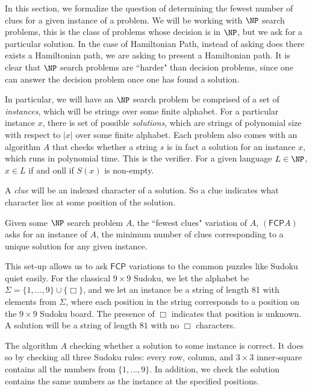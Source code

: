 \documentclass[runningheads,a4paper]{llncs}
\begin{document}
In this section, we formalize the question of determining the fewest number of clues for a given instance of a problem. We will be working with $\NP$ search problems, this is the class of problems whose decision is in $\NP$, but we ask for a particular solution. In the case of Hamiltonian Path, instead of asking does there exists a Hamiltonian path, we are asking to present a Hamiltonian path. It is clear that $\NP$ search problems are ``harder" than decision problems, since one can answer the decision problem once one has found a solution.

In particular, we will have an $\NP$ search problem be comprised of a set of \emph{instances}, which will be strings over some finite alphabet. For a particular instance $x$, there is set of possible \emph{solutions}, which are strings of polynomial size with respect to $|x|$ over some finite alphabet. Each problem also comes with an algorithm $A$ that checks whether a string $s$ is in fact a solution for an instance $x$, which runs in polynomial time. This is the verifier. For a given language $L \in \NP$, $x \in L$ if and onll if $S(x)$ is non-empty.

A \emph{clue} will be an indexed character of a solution. So a clue indicates what character lies at some position of the solution.

\begin{definition}
Given some $\NP$ search problem $A$, the ``fewest clues" variation of $A$, $(\mathsf{FCP} A)$ asks for an instance of $A$, the minimum number of clues corresponding to a unique solution for any given instance.
\end{definition}

This set-up allows us to ask $\mathsf{FCP}$ variations to the common puzzles like Sudoku quiet easily. For the classical $9 \times 9$ Sudoku, we let the alphabet be $\Sigma = \{ 1, ..., 9 \} \cup \{ \Box \}$, and we let an instance be a string of length 81 with elements from $\Sigma$, where each position in the string corresponds to a position on the $9 \times 9$ Sudoku board. The presence of $\Box$ indicates that position is unknown. A solution will be a string of length $81$ with no $\Box$ characters. 

The algorithm $A$ checking whether a solution to some instance is correct. It does so by checking all three Sudoku rules: every row, column, and $3 \times 3$ inner-square contains all the numbers from $\{1 , ..., 9\}$. In addition, we check the solution contains the same numbers as the instance at the specified positions.
\end{document}
